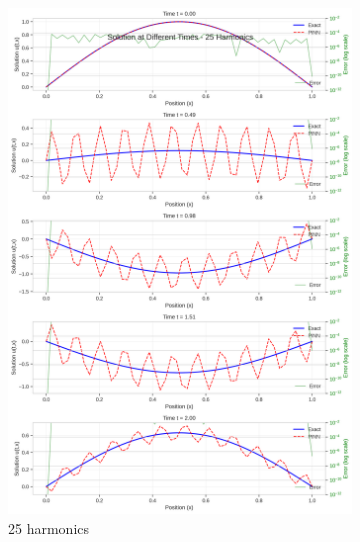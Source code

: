 \begin{figure}[H]
\begin{subfigure}[b]{0.32\textwidth}
        \includegraphics[width=\textwidth]{figures/time_slices_25h.png}
        \caption{25 harmonics}
    \end{subfigure}
    \hfill
    \begin{subfigure}[b]{0.32\textwidth}
        \centering

\end{subfigure}
\end{figure}

